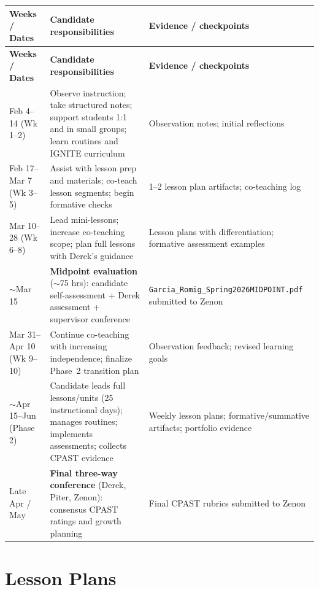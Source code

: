 \documentclass[10pt]{article}
\begin{document}
\begin{longtable}{|p{}|p{}|p{}|}
\hline
\textbf{Weeks / Dates} & \textbf{Candidate responsibilities} & \textbf{Evidence / checkpoints} \\
\hline
\endfirsthead
\hline
\textbf{Weeks / Dates} & \textbf{Candidate responsibilities} & \textbf{Evidence / checkpoints} \\
\hline
\endhead
\hline
\endfoot
Feb 4--14 (Wk 1--2) & Observe instruction; take structured notes; support students 1:1 and in small groups; learn routines and IGNITE curriculum & Observation notes; initial reflections \\
\hline
Feb 17--Mar 7 (Wk 3--5) & Assist with lesson prep and materials; co-teach lesson segments; begin formative checks & 1--2 lesson plan artifacts; co-teaching log \\
\hline
Mar 10--28 (Wk 6--8) & Lead mini-lessons; increase co-teaching scope; plan full lessons with Derek's guidance & Lesson plans with differentiation; formative assessment examples \\
\hline
$\sim$Mar 15 & \textbf{Midpoint evaluation} ($\sim$75 hrs): candidate self-assessment + Derek assessment + supervisor conference & \nolinkurl{Garcia_Romig_Spring2026MIDPOINT.pdf} submitted to Zenon \\
\hline
Mar 31--Apr 10 (Wk 9--10) & Continue co-teaching with increasing independence; finalize Phase~2 transition plan & Observation feedback; revised learning goals \\
\hline
$\sim$Apr 15--Jun (Phase 2) & Candidate leads full lessons/units (25 instructional days); manages routines; implements assessments; collects CPAST evidence & Weekly lesson plans; formative/summative artifacts; portfolio evidence \\
\hline
Late Apr / May & \textbf{Final three-way conference} (Derek, Piter, Zenon): consensus CPAST ratings and growth planning & Final CPAST rubrics submitted to Zenon \\
\hline
\end{longtable}

\section{Lesson Plans}
\end{document}
